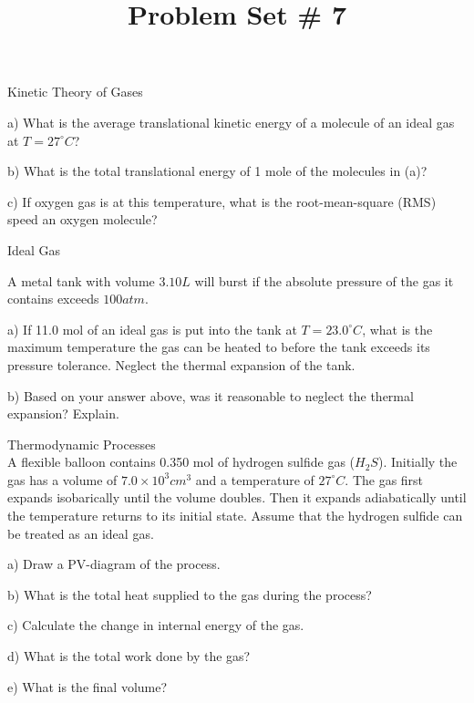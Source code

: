 \documentclass[10pt]{article}
\newenvironment{problem}[2][Problem]{\begin{trivlist}
\item[\hskip \labelsep {\bfseries #1}\hskip \labelsep {\bfseries #2.}]}{\end{trivlist}}
\begin{document}
 \title{Problem Set \# 7}
\date{}
\maketitle

\begin{problem}{1} Kinetic Theory of Gases

\item a) What is the average translational kinetic energy of a molecule of an ideal gas at $T=27^\circ C$?
\item b) What is the total translational energy of 1 mole of the molecules in (a)?
\item c) If oxygen gas is at this temperature, what is the root-mean-square (RMS) speed an oxygen molecule?
\end{problem}

\begin{problem}{2} Ideal Gas
\item A metal tank with volume $3.10L$ will burst if the absolute pressure of the gas it contains exceeds $100atm$.
\item a) If 11.0 mol of an ideal gas is put into the tank at $T=23.0^\circ C$, what is the maximum temperature the gas can be heated to before the tank exceeds its pressure tolerance. Neglect the thermal expansion of the tank.
\item b) Based on your answer above, was it reasonable to neglect the thermal expansion? Explain.
\end{problem}

\begin{problem}{3} Thermodynamic Processes\\
A flexible balloon contains 0.350 mol of hydrogen sulfide gas ($H_2S$). Initially the gas has a volume of $7.0 \times 10^3 cm^3$ and a temperature of $27^\circ C$. The gas first expands isobarically until the volume doubles. Then it expands adiabatically until the temperature returns to its initial state. Assume that the hydrogen sulfide can be treated as an ideal gas.
\item a) Draw a PV-diagram of the process.
\item b) What is the total heat supplied to the gas during the process?
\item c) Calculate the change in internal energy of the gas.
\item d) What is the total work done by the gas?
\item e) What is the final volume?
\end{problem}
\end{document}
